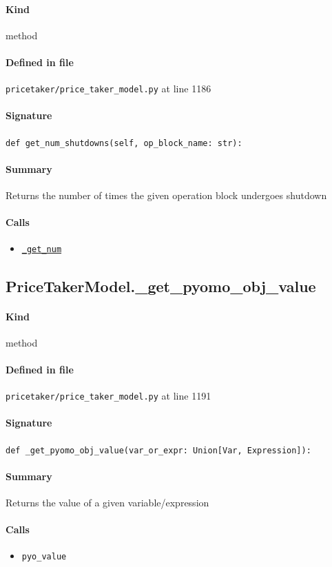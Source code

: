 \documentclass[11pt]{report}
\begin{document}
\paragraph{Kind} method
\paragraph{Defined in file} \texttt{pricetaker/price\_taker\_model.py} at line 1186
\paragraph{Signature} \texttt{def get\_num\_shutdowns(self, op\_block\_name: str):}
\paragraph{Summary} Returns the number of times the given operation block undergoes shutdown
\paragraph{Calls}
\begin{itemize}[leftmargin=*]
  \item \hyperref[def:pricetaker-price_taker_model.py:PriceTakerModel._get_num:L1155]{\texttt{\_get\_num}}
\end{itemize}
\subsection{PriceTakerModel.\_get\_pyomo\_obj\_value}
\label{def:pricetaker-price_taker_model.py:PriceTakerModel._get_pyomo_obj_value:L1191}
\paragraph{Kind} method
\paragraph{Defined in file} \texttt{pricetaker/price\_taker\_model.py} at line 1191
\paragraph{Signature} \texttt{def \_get\_pyomo\_obj\_value(var\_or\_expr: Union[Var, Expression]):}
\paragraph{Summary} Returns the value of a given variable/expression
\paragraph{Calls}
\begin{itemize}[leftmargin=*]
  \item \texttt{pyo\_value}
\end{itemize}
\end{document}
